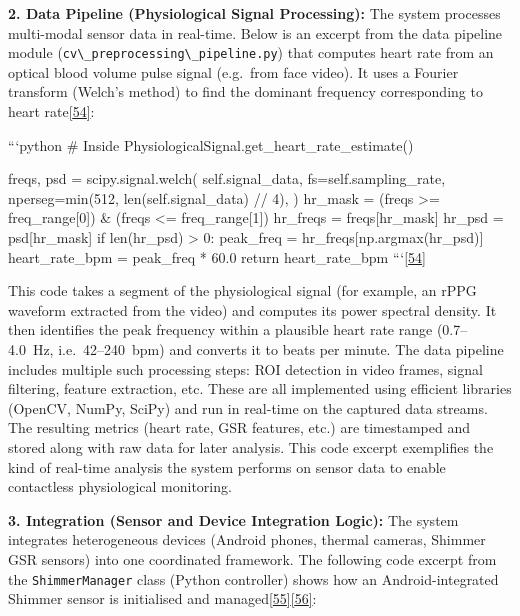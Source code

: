 \documentclass[12pt,a4paper]{article}
\begin{document}
\textbf{2. Data Pipeline (Physiological Signal Processing):} The system processes multi-modal sensor data in real-time. Below is an excerpt from the data pipeline module (\passthrough{\lstinline!cv\_preprocessing\_pipeline.py!}) that computes heart rate from an optical blood volume pulse signal (e.g.~from face video). It uses a Fourier transform (Welch's method) to find the dominant frequency corresponding to heart rate\href{PythonApp/webcam/cv_preprocessing_pipeline.py\#L72-L80}{{[}54{]}}:

```python \# Inside PhysiologicalSignal.get\_heart\_rate\_estimate()

freqs, psd = scipy.signal.welch( self.signal\_data, fs=self.sampling\_rate, nperseg=min(512, len(self.signal\_data) // 4), ) hr\_mask = (freqs \textgreater= freq\_range{[}0{]}) \& (freqs \textless= freq\_range{[}1{]}) hr\_freqs = freqs{[}hr\_mask{]} hr\_psd = psd{[}hr\_mask{]} if len(hr\_psd) \textgreater{} 0: peak\_freq = hr\_freqs{[}np.argmax(hr\_psd){]} heart\_rate\_bpm = peak\_freq * 60.0 return heart\_rate\_bpm ```\href{PythonApp/webcam/cv_preprocessing_pipeline.py\#L72-L80}{{[}54{]}}

This code takes a segment of the physiological signal (for example, an rPPG waveform extracted from the video) and computes its power spectral density. It then identifies the peak frequency within a plausible heart rate range (0.7--4.0~Hz, i.e.~42--240~bpm) and converts it to beats per minute. The data pipeline includes multiple such processing steps: ROI detection in video frames, signal filtering, feature extraction, etc. These are all implemented using efficient libraries (OpenCV, NumPy, SciPy) and run in real-time on the captured data streams. The resulting metrics (heart rate, GSR features, etc.) are timestamped and stored along with raw data for later analysis. This code excerpt exemplifies the kind of real-time analysis the system performs on sensor data to enable contactless physiological monitoring.

\textbf{3. Integration (Sensor and Device Integration Logic):} The system integrates heterogeneous devices (Android phones, thermal cameras, Shimmer GSR sensors) into one coordinated framework. The following code excerpt from the \passthrough{\lstinline!ShimmerManager!} class (Python controller) shows how an Android-integrated Shimmer sensor is initialised and managed\href{PythonApp/shimmer_manager.py\#L241-L249}{{[}55{]}}\href{PythonApp/shimmer_manager.py\#L250-L258}{{[}56{]}}:
\end{document}
